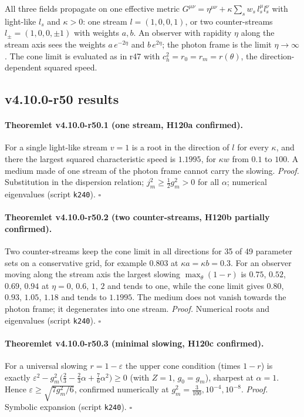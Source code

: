 All three fields propagate on one effective metric \(G^{\mu\nu}=\eta^{\mu\nu}+\kappa\sum_sw_s\,l_s^\mu l_s^\nu\) with light-like \(l_s\) and \(\kappa>0\): one stream \(l=(1,0,0,1)\), or two
counter-streams \(l_\pm=(1,0,0,\pm1)\) with weights \(a,b\).  An observer with rapidity \(\eta\) along the stream axis sees the weights \(a\,e^{-2\eta}\) and \(b\,e^{2\eta}\); the
photon frame is the limit \(\eta\to\infty\).  The cone limit is evaluated as in r47 with \(c_h^2=r_0=r_m=r(\theta)\), the direction-dependent squared speed.

\subsection*{v4.10.0-r50 results}
\label{subsec:v4100-r50-results}

\paragraph{Theoremlet v4.10.0-r50.1 (one stream, H120a confirmed).}
For a single light-like stream \(v=1\) is a root in the direction of \(l\) for every \(\kappa\), and there the largest squared characteristic speed is \(1.1995\), for \(\kappa w\) from
\(0.1\) to \(100\).  A medium made of one stream of the photon frame cannot carry the slowing.
\emph{Proof.} Substitution in the dispersion relation; \(j_m^2\ge\tfrac12g_m^2>0\) for all \(\alpha\); numerical eigenvalues (script \texttt{k240}).  \(\square\)

\paragraph{Theoremlet v4.10.0-r50.2 (two counter-streams, H120b partially confirmed).}
Two counter-streams keep the cone limit in all directions for 35 of 49 parameter sets on a conservative grid, for example \(0.803\) at \(\kappa a=\kappa b=0.3\).  For
an observer moving along the stream axis the largest slowing \(\max_\theta(1-r)\) is \(0.75\), \(0.52\), \(0.69\), \(0.94\) at \(\eta=0,\,0.6,\,1,\,2\) and tends to one, while the
cone limit gives \(0.80\), \(0.93\), \(1.05\), \(1.18\) and tends to \(1.1995\).  The medium does not vanish towards the photon frame; it degenerates into one stream.
\emph{Proof.} Numerical roots and eigenvalues (script \texttt{k240}).  \(\square\)

\paragraph{Theoremlet v4.10.0-r50.3 (minimal slowing, H120c confirmed).}
For a universal slowing \(r=1-\varepsilon\) the upper cone condition (times \(1-r\)) is exactly \(\varepsilon^2-g_m^2\bigl(\tfrac23-\tfrac23\alpha+\tfrac76\alpha^2\bigr)\ge0\) (with \(Z=1\), \(g_0=g_m\)), sharpest at
\(\alpha=1\).  Hence \(\varepsilon\ge\sqrt{7g_m^2/6}\), confirmed numerically at \(g_m^2=\tfrac3{100},10^{-4},10^{-8}\).
\emph{Proof.} Symbolic expansion (script \texttt{k240}).  \(\square\)

